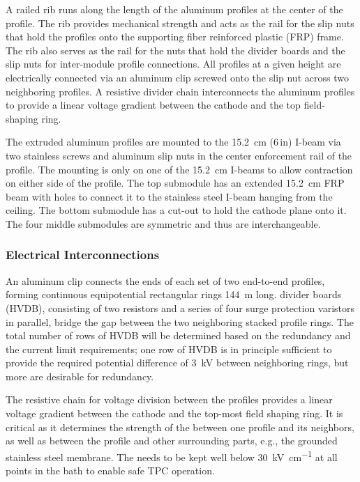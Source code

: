 A railed rib runs along the length of the aluminum profiles at the center of the profile.  The rib provides mechanical strength and acts as the rail for the slip nuts that hold the profiles onto the supporting fiber reinforced plastic (FRP) frame. The rib also serves as the rail for the nuts that hold the \hv divider boards and the slip nuts for inter-module profile connections.  
All profiles at a given height are electrically connected via an aluminum clip screwed onto the slip nut across two neighboring profiles.  A resistive divider chain interconnects the aluminum profiles to provide a linear voltage gradient between the cathode and the top field-shaping ring.   


The extruded aluminum profiles are mounted to the \SI{15.2}{\cm} (\num{6}\,in) I-beam via two stainless screws and aluminum slip nuts in the center enforcement rail of the profile. The mounting is only on one of the \SI{15.2}{\cm} I-beams to allow contraction on either side of the profile. The top submodule has an extended \SI{15.2}{\cm} FRP beam with holes to connect it to the stainless steel I-beam hanging from the ceiling.  The bottom submodule has a cut-out to hold the cathode plane onto it. The four middle submodules are symmetric and thus are interchangeable.


\subsubsection{Electrical Interconnections}

An aluminum clip connects the ends of each set of two end-to-end \fc profiles, forming continuous equipotential rectangular rings  \SI{144}{\m} long. 
  divider boards (HVDB), consisting of two resistors and a series of four surge protection varistors in parallel, bridge the gap between the two neighboring stacked profile rings.   The total number of rows of HVDB will be determined based on the redundancy and the current limit requirements;  one row of HVDB is in principle sufficient to provide the required potential difference of \SI{3}{\kV} between neighboring rings, but more are desirable for redundancy.


The resistive chain for voltage division between the profiles provides a linear voltage gradient between the cathode and the top-most field shaping ring. It is critical as it determines the strength of the \efield between one profile and its neighbors, as well as between the profile and other surrounding parts, e.g., the grounded stainless steel membrane. The \efield needs to be kept well below \SI{30}{\kV\per\cm} at all points in the \lar bath to enable safe TPC operation.

